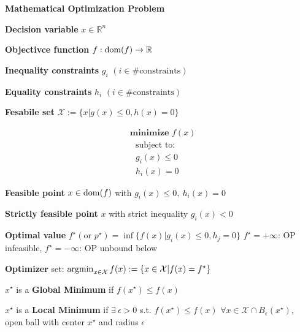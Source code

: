 


\begin{sstTitleBox}[Plum]{\textbf{\large
			Mathematical Optimization Problem
		}}
	\begin{minipage}{0.70\linewidth}
		\begin{sstOnlyFrame}[Plum]
			\textbf{Decision variable} $x  \in \mathbb{R}^{n}$

			\textbf{Objectivce function} $f: \operatorname{dom}(f)\to\mathbb{R}$

			\textbf{Inequality constraints} $g_i$
			$\scriptstyle(i \in \#\text{constraints})$

			\textbf{Equality constraints} $h_i$
			$\scriptstyle(i \in \#\text{constraints})$

			\textbf{Fesabile set}
			$\mathcal{X}\!\!:=\!\!\{x|g(x)\!\!\le\!\!0,\!h(x)\!=\!0\}$
		\end{sstOnlyFrame}
	\end{minipage}
	\begin{minipage}{0.28\linewidth}
		\begin{sstFullFrame}[Plum]
			{\color{white}
				\vspace{-1mm}
				\[ \begin{aligned}
						 & \textbf{minimize }f(x)   \\
						 & \ \ \ \text{subject to:} \\
						 & \ \ \ g_i(x)  \le 0      \\
						 & \ \ \ h_i(x)  = 0
					\end{aligned} \]
				\vspace{-1mm}
			}
		\end{sstFullFrame}
	\end{minipage}

	\begin{sstOnlyFrame}[Plum]
		\textbf{Feasible point}
		$x\in\operatorname{dom}(f)$ with
		$g_i(x)\le 0,\ h_i(x)=0$

		\textbf{Strictly feasible point}
		$x$ with strict inequality
		$g_i(x)<0$

		\textbf{Optimal value}
		$f^\star (\text{or } p^\star)=
			\inf\{f(x)|
			g_i(x)\le0,h_j=0 \}$
		$f^\star=+\infty$: OP infeasible,
		$f^\star=-\infty$: OP unbound below

		\textbf{Optimizer}
		set:
		$\operatorname{argmin}_{x \in \mathcal{X}} f(x):=
			\{ x\in\mathcal{X}|f(x)=f^\star\}$
	\end{sstOnlyFrame}

	\begin{sstOnlyFrame}[Plum]
		$x^\star$ is a \textbf{Global Minimum} if $f(x^\star)\leq f(x)$

		$x^\star$ is a \textbf{Local Minimum} if
		$\exists\ \epsilon > 0$ s.t.
		$f(x^\star)\leq f(x)$
		$\forall x \in \mathcal{X} \cap B_\epsilon(x^\star)$,
		open ball with center $x^\star$ and radius $\epsilon$
	\end{sstOnlyFrame}
\end{sstTitleBox}
